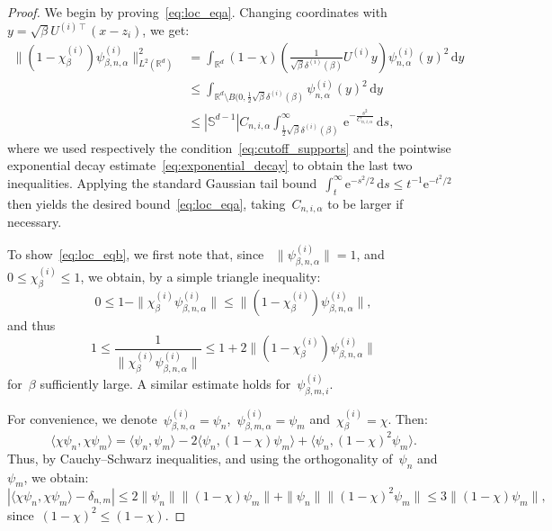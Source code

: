 \documentclass[10pt]{article}
\renewcommand{\d}{\mathrm{d}}
\newcommand{\e}{\mathrm{e}}
\newcommand{\R}{\mathbb{R}}
\newcommand{\1}{\mathbbm 1}
\newcommand{\deltai}{\delta^{(i)}}
\begin{document}
    \begin{proof}
        We begin by proving~\eqref{eq:loc_eqa}.
        Changing coordinates with~$y = \sqrt\beta U^{(i)\intercal}(x-z_i)$, we get:
        \begin{equation}
            \begin{aligned}
                \|(1-\chi_\beta^{(i)})\psi_{\beta,n,\alpha}^{(i)}\|^2_{L^2(\R^d)} &= \int_{\R^d}\left(1-\chi\right)\left(\frac1{\sqrt\beta\deltai(\beta)}U^{(i)}y\right)\psi^{(i)}_{n,\alpha}(y)^2\,\d y\\
                &\leq \int_{\R^d\setminus B(0,\frac12 \sqrt\beta\deltai(\beta)}\psi^{(i)}_{n,\alpha}(y)^2\,\d y\\
                &\leq |\mathbb S^{d-1}|C_{n,i,\alpha}\int_{\frac12 \sqrt\beta\deltai(\beta)}^\infty\,\e^{-\frac{s^2}{C_{n,i,\alpha}}}\,\d s,
            \end{aligned}
        \end{equation}
        where we used respectively the condition~\eqref{eq:cutoff_supports} and the pointwise exponential decay estimate~\eqref{eq:exponential_decay} to obtain the last two inequalities. Applying the standard Gaussian tail bound~$\int_t^\infty \e^{-s^2/2}\,\d s \leq t^{-1}\e^{-t^2/2}$ then yields the desired bound~\eqref{eq:loc_eqa}, taking~$C_{n,i,\alpha}$ to be larger if necessary.

        To show~\eqref{eq:loc_eqb}, we first note that, since
       ~$\|\psi^{(i)}_{\beta,n,\alpha}\| =1$, and~$0\leq \chi_\beta^{(i)}\leq 1$, we obtain, by a simple triangle inequality:
        \[0\leq 1-\|\chi_\beta^{(i)}\psi^{(i)}_{\beta,n,\alpha}\|\leq \|(1-\chi_\beta^{(i)})\psi^{(i)}_{\beta,n,\alpha}\|,\]
        and thus
        \begin{equation}
            \label{eq:lemme2_normalization}
            1\leq \frac1{\|\chi_\beta^{(i)}\psi^{(i)}_{\beta,n,\alpha}\|} \leq 1 + 2\|(1-\chi_\beta^{(i)})\psi^{(i)}_{\beta,n,\alpha}\|
        \end{equation}
        for~$\beta$ sufficiently large. A similar estimate holds for~$\psi^{(i)}_{\beta,m,i}$.

        For convenience, we denote~$\psi^{(i)}_{\beta,n,\alpha} = \psi_n$,~$\psi^{(i)}_{\beta,m,\alpha}=\psi_m$ and~$\chi_\beta^{(i)}=\chi$. Then:
        \[\langle \chi \psi_n,\chi \psi_m\rangle = \langle \psi_n,\psi_m\rangle - 2\langle \psi_n,(1-\chi)\psi_m\rangle + \langle\psi_n,(1-\chi)^2\psi_m\rangle.\]
        Thus, by Cauchy--Schwarz inequalities, and using the orthogonality of~$\psi_n$ and~$\psi_m$, we obtain:
       \[ \left|\langle \chi\psi_n,\chi\psi_m\rangle - \delta_{n,m}\right| \leq 2 \|\psi_n\|\|(1-\chi)\psi_m\| + \|\psi_n\|\|(1-\chi)^2\psi_m\| \leq 3\|(1-\chi)\psi_m\|,\]
       since~$(1-\chi)^2\leq (1-\chi)$.
        

\end{proof}
\end{document}
